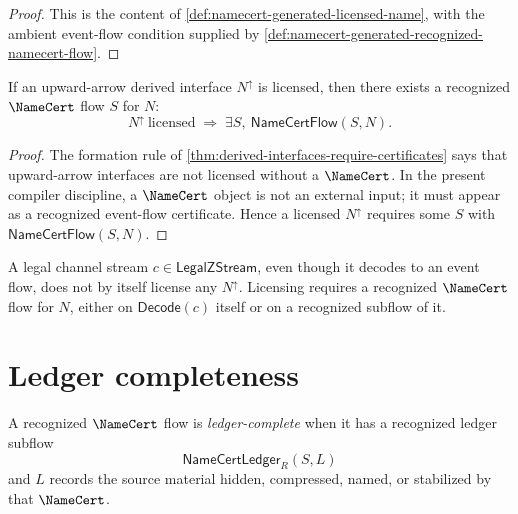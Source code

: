 \begin{proof}
This is the content of \autoref{def:namecert-generated-licensed-name}, with the ambient event-flow condition supplied by \autoref{def:namecert-generated-recognized-namecert-flow}.
\end{proof}

\begin{theorem}
\label{thm:namecert-generated-derived-interfaces-require-flow}
If an upward-arrow derived interface $N^{\uparrow}$ is licensed, then there exists a recognized $\NameCert$ flow $S$ for $N$:
$$
  N^{\uparrow}\ \mathrm{licensed}
  \;\Longrightarrow\;
  \exists S,\ \mathsf{NameCertFlow}(S,N).
$$
\end{theorem}

\begin{proof}
The formation rule of \autoref{thm:derived-interfaces-require-certificates} says that upward-arrow interfaces are not licensed without a $\NameCert$. In the present compiler discipline, a $\NameCert$ object is not an external input; it must appear as a recognized event-flow certificate. Hence a licensed $N^{\uparrow}$ requires some $S$ with $\mathsf{NameCertFlow}(S,N)$.
\end{proof}

\begin{corollary}
\label{cor:namecert-generated-no-upward-from-raw-code}
A legal channel stream $c \in \mathsf{LegalZStream}$, even though it decodes to an event flow, does not by itself license any $N^{\uparrow}$. Licensing requires a recognized $\NameCert$ flow for $N$, either on $\mathsf{Decode}(c)$ itself or on a recognized subflow of it.
\end{corollary}

\section{Ledger completeness}
\label{sec:namecert-generated-ledger-completeness}

\begin{definition}
\label{def:namecert-generated-ledger-complete}
A recognized $\NameCert$ flow is \emph{ledger-complete} when it has a recognized ledger subflow
$$
  \mathsf{NameCertLedger}_{R}(S,L)
$$
and $L$ records the source material hidden, compressed, named, or stabilized by that $\NameCert$.
\end{definition}

